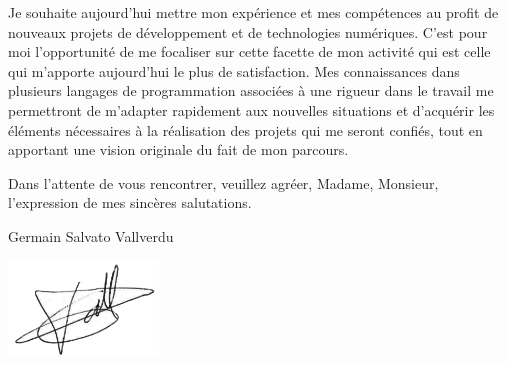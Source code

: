 \documentclass[11pt,a4paper,ragged2e]{../alta_letter}
\begin{document}
Je souhaite aujourd'hui mettre mon expérience et mes compétences au profit de nouveaux
projets de développement et de technologies numériques. C'est pour moi
l'opportunité de me focaliser sur cette facette de mon activité qui est celle qui m'apporte
aujourd'hui le plus de satisfaction. Mes connaissances dans
plusieurs langages de programmation associées à une
rigueur dans le travail me permettront de m'adapter rapidement aux nouvelles
situations et d'acquérir les éléments nécessaires à la réalisation des projets qui me
seront confiés, tout en apportant une vision originale du fait de mon parcours.

Dans l'attente de vous rencontrer, veuillez agréer, Madame, Monsieur, l'expression de mes sincères salutations.

\vspace{1cm}

\hspace{.6\textwidth}Germain Salvato Vallverdu

\hspace{.6\textwidth}\includegraphics[width=4cm]{../maSignature}
\end{document}
